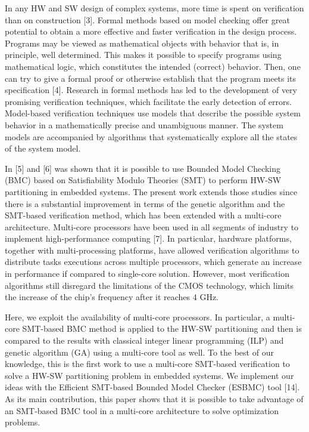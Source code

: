 In any HW and SW design of complex systems, more time is spent on verification than on construction [3]. Formal methods based on model checking offer great potential to obtain a more effective and faster verification in the design process. Programs may be viewed as mathematical objects with behavior that is, in principle, well determined. This makes it possible to specify programs using mathematical logic, which constitutes the intended (correct) behavior. Then, one can try to give a formal proof or otherwise establish that the program meets its specification [4]. Research in formal methods has led to the development of very promising verification techniques, which facilitate the early detection of errors. Model-based verification techniques use models that describe the possible system behavior in a mathematically precise and unambiguous manner. The system models are accompanied by algorithms that systematically explore all the states of the system model.

In [5] and [6] was shown that it is possible to use Bounded Model Checking (BMC) based on Satisfiability Modulo Theories (SMT) to perform HW-SW partitioning in embedded systems. The present work extends those studies since there is a substantial improvement in terms of the genetic algorithm and the SMT-based verification method, which has been extended with a multi-core architecture. Multi-core processors have been used in all segments of industry to implement high-performance computing [7]. In particular, hardware platforms, together with multi-processing platforms, have allowed verification algorithms to distribute tasks executions across multiple processors, which generate an increase in performance if compared to single-core solution. However, most verification algorithms still disregard the limitations of the CMOS technology, which limits the increase of the chip’s frequency after it reaches 4 GHz.

Here, we exploit the availability of multi-core processors. In particular, a multi-core SMT-based BMC method is applied to the HW-SW partitioning and then is compared to the results with classical integer linear programming (ILP) and genetic algorithm (GA) using a multi-core tool as well. To the best of our knowledge, this is the first work to use a multi-core SMT-based verification to solve a HW-SW partitioning problem in embedded systems. We implement our ideas with the Efficient SMT-based Bounded Model Checker (ESBMC) tool [14]. As its main contribution, this paper shows that it is possible to take advantage of an SMT-based BMC tool in a multi-core architecture to solve optimization problems.

